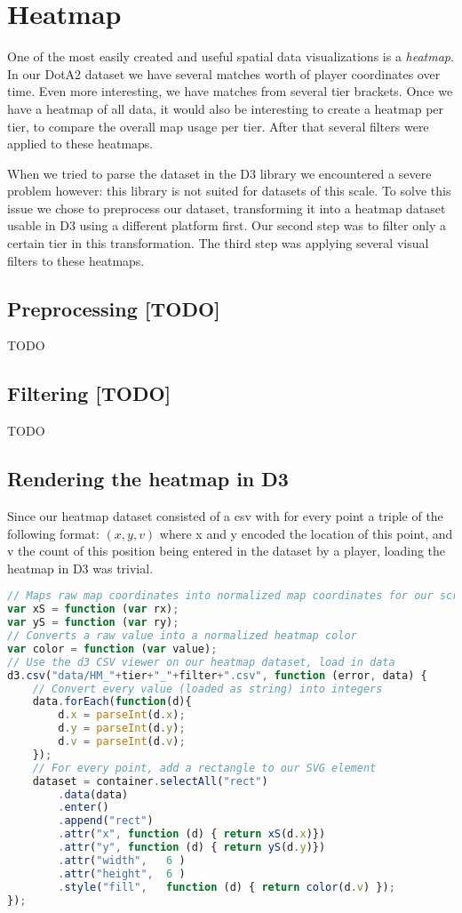 \section{Heatmap}
One of the most easily created and useful spatial data visualizations is a \emph{heatmap}. In our DotA2 dataset we have several matches worth of player coordinates over time. Even more interesting, we have matches from several tier brackets. Once we have a heatmap of all data, it would also be interesting to create a heatmap per tier, to compare the overall map usage per tier. After that several filters were applied to these heatmaps.

When we tried to parse the dataset in the D3 library we encountered a severe problem however: this library is not suited for datasets of this scale. To solve this issue we chose to preprocess our dataset, transforming it into a heatmap dataset usable in D3 using a different platform first. Our second step was to filter only a certain tier in this transformation. The third step was applying several visual filters to these heatmaps.

\subsection{Preprocessing [TODO]}
TODO

\subsection{Filtering [TODO]}
TODO

\subsection{Rendering the heatmap in D3}
Since our heatmap dataset consisted of a csv with for every point a triple of the following format: $(x, y, v)$ where x and y encoded the location of this point, and v the count of this position being entered in the dataset by a player, loading the heatmap in D3 was trivial.

\begin{lstlisting}[language=JavaScript]
// Maps raw map coordinates into normalized map coordinates for our screen
var xS = function (var rx);
var yS = function (var ry);
// Converts a raw value into a normalized heatmap color
var color = function (var value);
// Use the d3 CSV viewer on our heatmap dataset, load in data
d3.csv("data/HM_"+tier+"_"+filter+".csv", function (error, data) {
	// Convert every value (loaded as string) into integers
	data.forEach(function(d){
	    d.x = parseInt(d.x);
	    d.y = parseInt(d.y);
	    d.v = parseInt(d.v);
	});
	// For every point, add a rectangle to our SVG element
	dataset = container.selectAll("rect")
	    .data(data)
	    .enter()
	    .append("rect")
	    .attr("x", function (d) { return xS(d.x)})
	    .attr("y", function (d) { return yS(d.y)})
	    .attr("width",   6 ) 
	    .attr("height",  6 )
	    .style("fill",   function (d) { return color(d.v) });
});
\end{lstlisting}